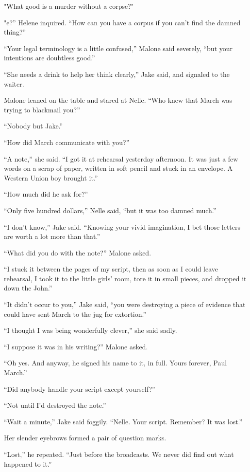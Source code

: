 \documentclass{novel}
\begin{document}
"What good is a murder without a corpse?"

"e?” Helene inquired. “How can you have a corpus if you can’t find the damned thing?”

“Your legal terminology is a little confused,” Malone said severely, “but your intentions are doubtless good.”

“She needs a drink to help her think clearly,” Jake said, and signaled to the waiter.

Malone leaned on the table and stared at Nelle. “Who knew that March was trying to blackmail you?”

“Nobody but Jake.”

“How did March communicate with you?”

“A note,” she said. “I got it at rehearsal yesterday afternoon. It was just a few words on a scrap of paper, written in soft pencil and stuck in an envelope. A Western Union boy brought it.”

“How much did he ask for?”

“Only five hundred dollars,” Nelle said, “but it was too damned much.”

“I don’t know,” Jake said. “Knowing your vivid imagination, I bet those letters are worth a lot more than that.”

“What did you do with the note?” Malone asked.

“I stuck it between the pages of my script, then as soon as I could leave rehearsal, I took it to the little girls’ room, tore it in small pieces, and dropped it down the John.”

“It didn’t occur to you,” Jake said, “you were destroying a piece of evidence that could have sent March to the jug for extortion.”

“I thought I was being wonderfully clever,” she said sadly.

“I suppose it was in his writing?” Malone asked.

“Oh yes. And anyway, he signed his name to it, in full. Yours forever, Paul March.”

“Did anybody handle your script except yourself?”

“Not until I'd destroyed the note.”

“Wait a minute,” Jake said foggily. “Nelle. Your script. Remember? It was lost.”

Her slender eyebrows formed a pair of question marks.

“Lost,” he repeated. “Just before the broadcasts. We never did find out what happened to it.”
\end{document}
